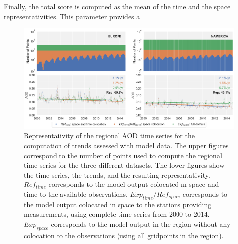 \documentclass[journal abbreviation, manuscript]{copernicus}
\begin{document}
Finally, the total score is computed as the mean of the time and the space representativities. This parameter provides a

\begin{figure}[t]
 \includegraphics[width=16cm]{../scripts/figs/representativity-od550aer.png}
 \caption{Representativity of the regional AOD time series for the computation of trends assessed with model data. The upper figures correspond to the number of points used to compute the regional time series for the three different datasets. The lower figures show the time series, the trends, and the resulting representativity. $Ref_{time}$ corresponds to the model output colocated in space and time to the available observations. $Exp_{time}/Ref_{space}$ corresponds to the model output colocated in space to the stations providing measurements, using complete time series from 2000 to 2014. $Exp_{space}$ corresponds to the model output in the region without any colocation to the observations (using all gridpoints in the region).}
 \label{fig:representativity}
\end{figure}
\end{document}
